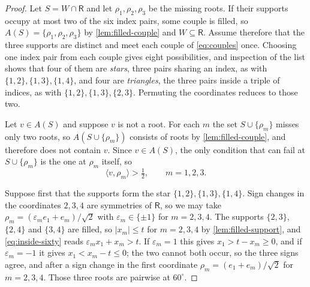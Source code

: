 \documentclass[11pt,reqno]{amsart}
\renewcommand{\_}{\origunderscore\allowbreak}
\numberwithin{equation}{section}
\theoremstyle{plain}
\theoremstyle{definition}
\theoremstyle{remark}
\newcommand{\Rt}{\mathsf{R}}                 %
\begin{document}
\begin{proof}
Let $S=W\cap\Rt$ and let $\rho_1,\rho_2,\rho_3$ be the missing roots. If
their supports occupy at most two of the six index pairs, some couple is
filled, so $A(S)=\{\rho_1,\rho_2,\rho_3\}$ by \cref{lem:filled-couple}
and $W\subseteq\Rt$. Assume therefore that the three supports are distinct and meet
each couple of \eqref{eq:couples} once. Choosing one index pair from each
couple gives eight possibilities, and inspection of the list shows that
four of them are \emph{stars}, three pairs sharing an index, as with
$\{1,2\},\{1,3\},\{1,4\}$, and four are \emph{triangles}, the three pairs
inside a triple of indices, as with $\{1,2\},\{1,3\},\{2,3\}$. Permuting
the coordinates reduces to those two.

Let $v\in A(S)$ and suppose $v$ is not a root. For each $m$ the set
$S\cup\{\rho_m\}$ misses only two roots, so $A(S\cup\{\rho_m\})$ consists
of roots by \cref{lem:filled-couple}, and therefore does not contain $v$.
Since $v\in A(S)$, the only condition that can fail at $S\cup\{\rho_m\}$
is the one at $\rho_m$ itself, so
\begin{equation}\label{eq:inside-sixty}
  \langle v,\rho_m\rangle>\tfrac12,\qquad m=1,2,3 .
\end{equation}

Suppose first that the supports form the star $\{1,2\},\{1,3\},\{1,4\}$.
Sign changes in the coordinates $2,3,4$ are symmetries of $\Rt$, so we
may take $\rho_m=(\varepsilon_me_1+e_m)/\sqrt2$ with
$\varepsilon_m\in\{\pm1\}$ for $m=2,3,4$. The supports $\{2,3\}$,
$\{2,4\}$ and $\{3,4\}$ are filled, so $|x_m|\le t$ for $m=2,3,4$ by
\cref{lem:filled-support}, and \eqref{eq:inside-sixty} reads
$\varepsilon_mx_1+x_m>t$. If $\varepsilon_m=1$ this gives
$x_1>t-x_m\ge0$, and if $\varepsilon_m=-1$ it gives $x_1<x_m-t\le0$; the
two cannot both occur, so the three signs agree, and after a sign change
in the first coordinate $\rho_m=(e_1+e_m)/\sqrt2$ for $m=2,3,4$. Those
three roots are pairwise at $60^\circ$.


\end{proof}
\end{document}
